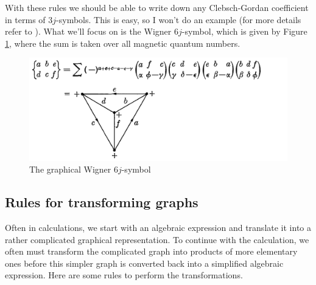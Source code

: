 \documentclass[11pt]{article}
\begin{document}
With these rules we should be able to write down any  Clebsch-Gordan coefficient in terms of $3j$-symbols. This is easy, so I won't do an example (for more details refer to \cite{angular_momentum}). What we'll focus on is the Wigner $6j$-symbol, which is given by Figure \ref{fig:6j}, where the sum is taken over all magnetic quantum numbers. 
\begin{figure}[!htb]
	\centering
	\includegraphics[scale=0.7]{j6_graph}
	\caption{The graphical Wigner $6j$-symbol \cite{angular_momentum}}
	\label{fig:6j}
\end{figure}


\subsection{Rules for transforming graphs}
Often in calculations, we start with an algebraic expression and translate it into a rather complicated graphical representation. To continue with the calculation, we often must transform the complicated graph into products of more elementary ones before this simpler graph is converted back into a simplified algebraic expression. Here are some rules to perform the transformations. 
\end{document}
